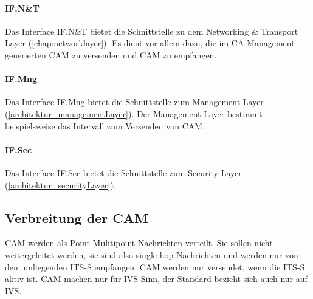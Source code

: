 \paragraph{IF.N\&T}
Das Interface IF.N\&T bietet die Schnittstelle zu dem Networking \& Transport Layer (\autoref{chap:networklayer}). Es dient vor allem dazu, die im \ac{CA} Management generierten \ac{CAM} zu versenden und \ac{CAM} zu empfangen. 

\paragraph{IF.Mng}
Das Interface IF.Mng bietet die Schnittstelle zum Management Layer (\autoref{architektur_managementLayer}). Der Management Layer bestimmt beispielsweise das Intervall zum Versenden von \ac{CAM}.

\paragraph{IF.Sec}
Das Interface IF.Sec bietet die Schnittstelle zum Security Layer (\autoref{architektur_securityLayer}).

\subsection{Verbreitung der CAM}
\ac{CAM} werden als Point-Mulitipoint Nachrichten verteilt. Sie sollen nicht weitergeleitet werden, sie sind also single hop Nachrichten und werden nur von den umliegenden \ac{ITS-S} empfangen. \ac{CAM} werden nur versendet, wenn die \ac{ITS-S} aktiv ist. \ac{CAM} machen nur für \ac{IVS} Sinn, der Standard \cite{en302637-2} bezieht sich auch nur auf \ac{IVS}. 

